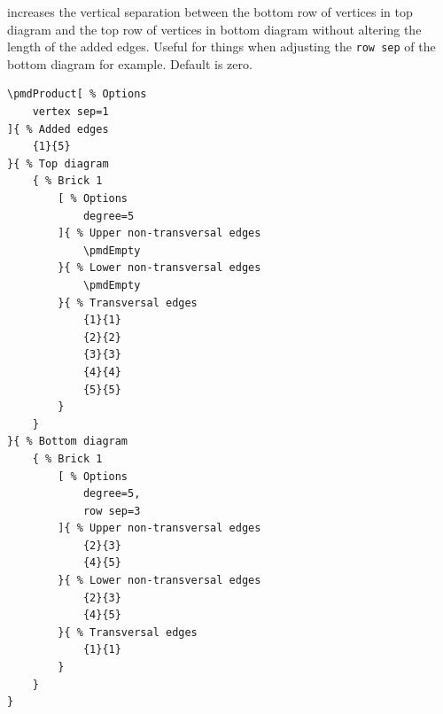 \documentclass{ltxdoc}
\begin{document}
increases the vertical separation between the bottom row of vertices in top diagram and the top row of vertices in bottom diagram without altering the length of the added edges. Useful for things when adjusting the \texttt{row sep} of the bottom diagram for example. Default is zero.
\begin{center}
    \begin{minipage}{\dimexpr0.85\textwidth-2\fboxrule-2\fboxsep\relax}
        \begin{minipage}[c]{0.4\linewidth}
\begin{verbatim}
\pmdProduct[ % Options
    vertex sep=1
]{ % Added edges
    {1}{5}
}{ % Top diagram
    { % Brick 1
        [ % Options
            degree=5
        ]{ % Upper non-transversal edges
            \pmdEmpty
        }{ % Lower non-transversal edges
            \pmdEmpty
        }{ % Transversal edges
            {1}{1}
            {2}{2}
            {3}{3}
            {4}{4}
            {5}{5}
        }
    }
}{ % Bottom diagram
    { % Brick 1
        [ % Options
            degree=5,
            row sep=3
        ]{ % Upper non-transversal edges
            {2}{3}
            {4}{5}
        }{ % Lower non-transversal edges
            {2}{3}
            {4}{5}
        }{ % Transversal edges
            {1}{1}
        }
    }
}
\end{verbatim}
        \end{minipage}
        \hfill
        \begin{minipage}[c]{0.4\linewidth}
        \end{minipage}
    \end{minipage}%
\end{center}
\begin{center}
\end{center}
\end{document}
